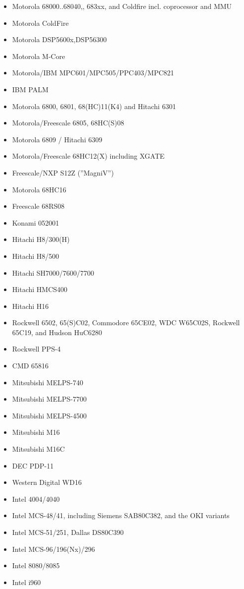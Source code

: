 \documentclass[12pt,twoside]{report}
\begin{document}
\begin{itemize}
\item{Motorola 68000..68040,, 683xx, and Coldfire incl. coprocessor and MMU}
\item{Motorola ColdFire}
\item{Motorola DSP5600x,DSP56300}\item{Motorola M-Core}
\item{Motorola/IBM MPC601/MPC505/PPC403/MPC821}
\item{IBM PALM}
\item{Motorola 6800, 6801, 68(HC)11(K4) and Hitachi 6301}
\item{Motorola/Freescale 6805, 68HC(S)08}
\item{Motorola 6809 / Hitachi 6309}
\item{Motorola/Freescale 68HC12(X) including XGATE}
\item{Freescale/NXP S12Z (''MagniV'')}
\item{Motorola 68HC16}
\item{Freescale 68RS08}
\item{Konami 052001}
\item{Hitachi H8/300(H)}
\item{Hitachi H8/500}
\item{Hitachi SH7000/7600/7700}
\item{Hitachi HMCS400}
\item{Hitachi H16}
\item{Rockwell 6502, 65(S)C02, Commodore 65CE02, WDC W65C02S, Rockwell 65C19, and
      Hudson HuC6280}
\item{Rockwell PPS-4}
\item{CMD 65816}
\item{Mitsubishi MELPS-740}
\item{Mitsubishi MELPS-7700}
\item{Mitsubishi MELPS-4500}
\item{Mitsubishi M16}
\item{Mitsubishi M16C}
\item{DEC PDP-11}
\item{Western Digital WD16}
\item{Intel 4004/4040}
\item{Intel MCS-48/41, including Siemens SAB80C382, and the OKI
      variants}
\item{Intel MCS-51/251, Dallas DS80C390}
\item{Intel MCS-96/196(Nx)/296}
\item{Intel 8080/8085}
\item{Intel i960}

\end{itemize}
\end{document}
